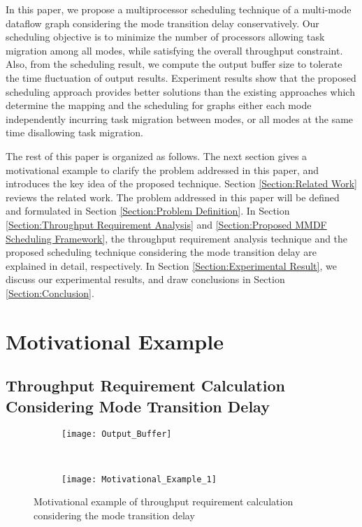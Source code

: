 \documentclass[prodmode,acmtecs]{acmsmall}
\begin{document}
In this paper, we propose a multiprocessor scheduling technique of a multi-mode dataflow graph considering the mode transition delay conservatively. Our scheduling objective is to minimize the number of processors allowing task migration among all modes, while satisfying the overall throughput constraint. Also, from the scheduling result, we compute the output buffer size to tolerate the time fluctuation of output results. Experiment results show that the proposed scheduling approach provides better solutions than the existing approaches which determine the mapping and the scheduling for graphs either each mode independently incurring task migration between modes, or all modes at the same time disallowing task migration.

The rest of this paper is organized as follows. The next section gives a motivational example to clarify the problem addressed in this paper, and introduces the key idea of the proposed technique. Section \ref{Section:Related Work} reviews the related work. The problem addressed in this paper will be defined and formulated in Section \ref{Section:Problem Definition}. In Section \ref{Section:Throughput Requirement Analysis} and \ref{Section:Proposed MMDF Scheduling Framework}, the throughput requirement analysis technique and the proposed scheduling technique considering the mode transition delay are explained in detail, respectively. In Section \ref{Section:Experimental Result}, we discuss our experimental results, and draw conclusions in Section \ref{Section:Conclusion}.

\section{Motivational Example}
\label{Section:Motivational Example}

\subsection{Throughput Requirement Calculation Considering Mode Transition Delay}
\label{SubSection:Mode Transition Delay}

\begin{figure}[ht]
\centering
  \begin{subfigure}{}
    \texttt{[image: Output\_Buffer]}
    \\
  \end{subfigure}
  \hfill
  \\
  \begin{subfigure}{}
    \texttt{[image: Motivational\_Example\_1]}
    \\
  \end{subfigure}
  \caption{Motivational example of throughput requirement calculation considering the mode transition delay}
  \label{Figure:Motivational Example of Mode transition}
\end{figure}
\end{document}
